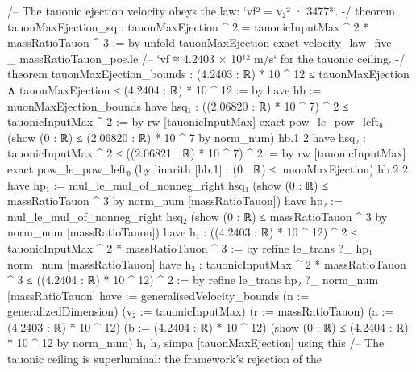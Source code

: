\documentclass[11pt,a4paper]{article}
\begin{document}
{\mbox{}
/-- The tauonic ejection velocity obeys the law: `vf² = v₂² · 3477³`. -/
theorem tauonMaxEjection\_\allowbreak{}sq :
    tauonMaxEjection \textasciicircum{} 2 = tauonicInputMax \textasciicircum{} 2 * massRatioTauon \textasciicircum{} 3 := by
  unfold tauonMaxEjection
  exact velocity\_\allowbreak{}law\_\allowbreak{}five \_\allowbreak{} \_\allowbreak{} massRatioTauon\_\allowbreak{}pos.le
\mbox{}
/-- `vf ≈ 4.2403 × 10¹² m/s` for the tauonic ceiling. -/
theorem tauonMaxEjection\_\allowbreak{}bounds :
    (4.2403 : ℝ) * 10 \textasciicircum{} 12 ≤ tauonMaxEjection ∧
      tauonMaxEjection ≤ (4.2404 : ℝ) * 10 \textasciicircum{} 12 := by
  have hb := muonMaxEjection\_\allowbreak{}bounds
  have hsq₁ : ((2.06820 : ℝ) * 10 \textasciicircum{} 7) \textasciicircum{} 2 ≤ tauonicInputMax \textasciicircum{} 2 := by
    rw [tauonicInputMax]
    exact pow\_\allowbreak{}le\_\allowbreak{}pow\_\allowbreak{}left₀ (show (0 : ℝ) ≤ (2.06820 : ℝ) * 10 \textasciicircum{} 7 by norm\_\allowbreak{}num) hb.1 2
  have hsq₂ : tauonicInputMax \textasciicircum{} 2 ≤ ((2.06821 : ℝ) * 10 \textasciicircum{} 7) \textasciicircum{} 2 := by
    rw [tauonicInputMax]
    exact pow\_\allowbreak{}le\_\allowbreak{}pow\_\allowbreak{}left₀ (by linarith [hb.1] : (0 : ℝ) ≤ muonMaxEjection) hb.2 2
  have hp₁ := mul\_\allowbreak{}le\_\allowbreak{}mul\_\allowbreak{}of\_\allowbreak{}nonneg\_\allowbreak{}right hsq₁
    (show (0 : ℝ) ≤ massRatioTauon \textasciicircum{} 3 by norm\_\allowbreak{}num [massRatioTauon])
  have hp₂ := mul\_\allowbreak{}le\_\allowbreak{}mul\_\allowbreak{}of\_\allowbreak{}nonneg\_\allowbreak{}right hsq₂
    (show (0 : ℝ) ≤ massRatioTauon \textasciicircum{} 3 by norm\_\allowbreak{}num [massRatioTauon])
  have h₁ : ((4.2403 : ℝ) * 10 \textasciicircum{} 12) \textasciicircum{} 2 ≤ tauonicInputMax \textasciicircum{} 2 * massRatioTauon \textasciicircum{} 3 := by
    refine le\_\allowbreak{}trans ?\_\allowbreak{} hp₁
    norm\_\allowbreak{}num [massRatioTauon]
  have h₂ : tauonicInputMax \textasciicircum{} 2 * massRatioTauon \textasciicircum{} 3 ≤ ((4.2404 : ℝ) * 10 \textasciicircum{} 12) \textasciicircum{} 2 := by
    refine le\_\allowbreak{}trans hp₂ ?\_\allowbreak{}
    norm\_\allowbreak{}num [massRatioTauon]
  have := generalisedVelocity\_\allowbreak{}bounds (n := generalizedDimension)
    (v₂ := tauonicInputMax) (r := massRatioTauon)
    (a := (4.2403 : ℝ) * 10 \textasciicircum{} 12) (b := (4.2404 : ℝ) * 10 \textasciicircum{} 12)
    (show (0 : ℝ) ≤ (4.2404 : ℝ) * 10 \textasciicircum{} 12 by norm\_\allowbreak{}num) h₁ h₂
  simpa [tauonMaxEjection] using this
\mbox{}
/-- The tauonic ceiling is superluminal: the framework's rejection of the
}
\end{document}
